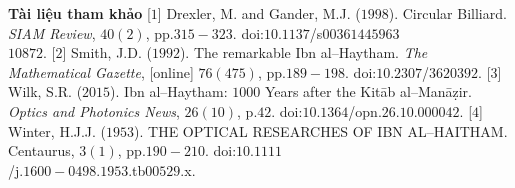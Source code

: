 \begin{multicols}{2}
\begin{figure}[H]
		\vspace*{-10pt}
	\end{figure}
	\vskip 0.1cm
	\textbf{\color{lichsutoanhoc}Tài liệu tham khảo}
	\vskip 0.1cm
	[$1$] Drexler, M. and Gander, M.J. ($1998$). Circular Billiard. \textit{SIAM Review}, $40(2)$, pp.$315-323$. doi:$10.1137$/s$00361445963$\\$10872$.
	\vskip 0.1cm
	[$2$] Smith, J.D. ($1992$). The remarkable Ibn al--Haytham. \textit{The Mathematical Gazette}, [online] $76(475)$, pp.$189-198$. doi:$10.2307$/$3620392$.
	\vskip 0.1cm
	[$3$] Wilk, S.R. ($2015$). Ibn al--Haytham: $1000$ Years after the Kitāb al--Manāẓir. \textit{Optics and Photonics News}, $26(10)$, p.$42$. doi:$10.1364$/opn.$26.10.000042$.
	\vskip 0.1cm
	[$4$] Winter, H.J.J. ($1953$). THE OPTICAL RESEARCHES OF IBN AL--HAITHAM. Centaurus, $3(1)$, pp.$190-210$. doi:$10.1111$\\/j.$1600-0498$.$1953$.tb$00529$.x.
\end{multicols}